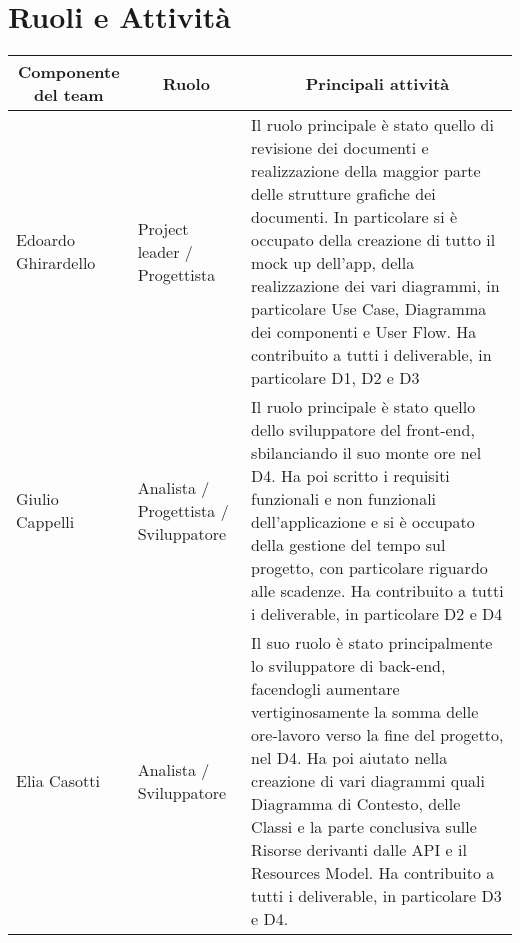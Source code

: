 \documentclass{article}
\begin{document}
\section{Ruoli e Attività}
\begin{center}
    \begin{longtable}{|l|l|p{6cm}|}
        \hline
        \multicolumn{1}{|c}{\textbf{Componente del team}} & \multicolumn{1}{|c|}{\textbf{Ruolo}}  & \multicolumn{1}{c|}{\textbf{Principali attività}}                                                                                                                                                                                                                                                                                                                                                            \\ \hline
        Edoardo Ghirardello                               & Project leader / Progettista          & Il ruolo principale è stato quello di revisione dei documenti e realizzazione della maggior parte delle strutture grafiche dei documenti. In particolare si è occupato della creazione di tutto il mock up dell'app, della realizzazione dei vari diagrammi, in particolare Use Case, Diagramma dei componenti e User Flow. Ha contribuito a tutti i deliverable, in particolare D1, D2 e D3                 \\ \hline
        Giulio Cappelli                                   & Analista / Progettista / Sviluppatore & Il ruolo principale è stato quello dello sviluppatore del front-end, sbilanciando il suo monte ore nel D4. Ha poi scritto i requisiti funzionali e non funzionali dell'applicazione e si è occupato della gestione del tempo sul progetto, con particolare riguardo alle scadenze. Ha contribuito a tutti i deliverable, in particolare D2 e D4                                                              \\ \hline
        Elia Casotti                                      & Analista / Sviluppatore               & Il suo ruolo è stato principalmente lo sviluppatore di back-end, facendogli aumentare vertiginosamente la somma delle ore-lavoro verso la fine del progetto, nel D4. Ha poi aiutato nella creazione di vari diagrammi quali Diagramma di Contesto, delle Classi e la parte conclusiva sulle Risorse derivanti dalle API  e il Resources Model. Ha contribuito a tutti i deliverable, in particolare D3 e D4. \\ \hline
    \end{longtable}
\end{center}
\clearpage
\end{document}
